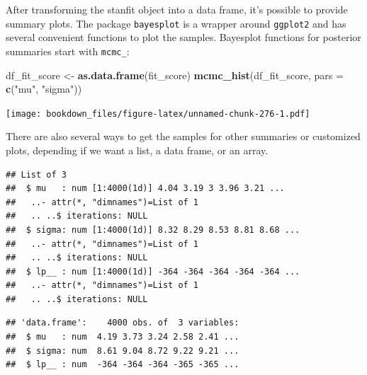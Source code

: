 \documentclass[12pt,]{krantz}
\newenvironment{Shaded}{\begin{snugshade}}{\end{snugshade}}
\newcommand{\DataTypeTok}[1]{\textcolor[rgb]{0.13,0.29,0.53}{#1}}
\newcommand{\DecValTok}[1]{\textcolor[rgb]{0.00,0.00,0.81}{#1}}
\newcommand{\KeywordTok}[1]{\textcolor[rgb]{0.13,0.29,0.53}{\textbf{#1}}}
\newcommand{\NormalTok}[1]{#1}
\newcommand{\OperatorTok}[1]{\textcolor[rgb]{0.81,0.36,0.00}{\textbf{#1}}}
\newcommand{\StringTok}[1]{\textcolor[rgb]{0.31,0.60,0.02}{#1}}
\theoremstyle{definition}
\theoremstyle{definition}
\theoremstyle{definition}
\theoremstyle{remark}
\begin{document}
After transforming the stanfit object into a data frame, it's possible to provide summary plots. The package \texttt{bayesplot} \citep{R-bayesplot} is a wrapper around \texttt{ggplot2} \citep{R-ggplot2} and has several convenient functions to plot the samples. Bayesplot functions for posterior summaries start with \texttt{mcmc\_}:

\begin{Shaded}
\begin{Highlighting}[]
\NormalTok{df_fit_score <-}\StringTok{ }\KeywordTok{as.data.frame}\NormalTok{(fit_score)}
\KeywordTok{mcmc_hist}\NormalTok{(df_fit_score, }\DataTypeTok{pars =} \KeywordTok{c}\NormalTok{(}\StringTok{"mu"}\NormalTok{, }\StringTok{"sigma"}\NormalTok{)) }
\end{Highlighting}
\end{Shaded}

\texttt{[image: bookdown\_files/figure-latex/unnamed-chunk-276-1.pdf]}

There are also several ways to get the samples for other summaries or customized plots, depending if we want a list, a data frame, or an array.

\begin{Shaded}
\end{Shaded}

\begin{verbatim}
## List of 3
##  $ mu   : num [1:4000(1d)] 4.04 3.19 3 3.96 3.21 ...
##   ..- attr(*, "dimnames")=List of 1
##   .. ..$ iterations: NULL
##  $ sigma: num [1:4000(1d)] 8.32 8.29 8.53 8.81 8.68 ...
##   ..- attr(*, "dimnames")=List of 1
##   .. ..$ iterations: NULL
##  $ lp__ : num [1:4000(1d)] -364 -364 -364 -364 -364 ...
##   ..- attr(*, "dimnames")=List of 1
##   .. ..$ iterations: NULL
\end{verbatim}

\begin{Shaded}
\end{Shaded}

\begin{verbatim}
## 'data.frame':    4000 obs. of  3 variables:
##  $ mu   : num  4.19 3.73 3.24 2.58 2.41 ...
##  $ sigma: num  8.61 9.04 8.72 9.22 9.21 ...
##  $ lp__ : num  -364 -364 -364 -365 -365 ...
\end{verbatim}
\end{document}
